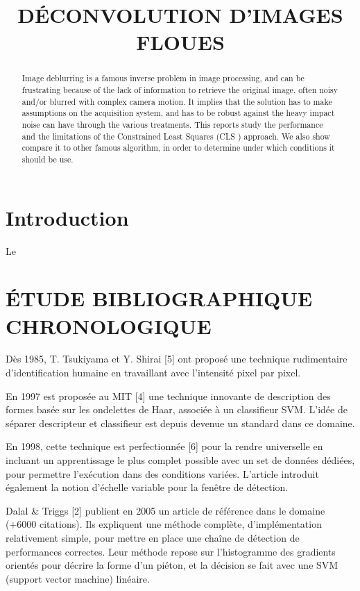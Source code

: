 \documentclass{article}
\title{D\'{E}CONVOLUTION D'IMAGES FLOUES}
\begin{document}
%
\maketitle
%
\begin{abstract}
	
	Image deblurring is a famous inverse problem in image processing, and can be frustrating because of the lack of information to retrieve the original image, often noisy and/or blurred with complex camera motion. It implies that the solution has to make assumptions on the acquisition system, and has to be robust against the heavy impact noise can have through the various treatments.
	This reports study the performance and the limitations of the Constrained Least Squares (CLS ) approach. We also show compare it to other famous algorithm, in order to determine under which conditions it should be use.
	
\end{abstract}
%

%
\section{Introduction}
\label{sec:intro}
	Le

\section{\'{E}TUDE BIBLIOGRAPHIQUE CHRONOLOGIQUE}
\label{sec:format}

	Dès 1985, T. Tsukiyama et Y. Shirai [5] ont proposé une technique rudimentaire d'identification humaine en travaillant avec l'intensité pixel par pixel.

	En 1997 est proposée au MIT [4] une technique innovante de description des formes basée sur les ondelettes de Haar, associée à un classifieur SVM. L'idée de séparer descripteur et classifieur est depuis devenue un standard dans ce domaine.

	En 1998, cette technique est perfectionnée [6] pour la rendre universelle en incluant un apprentissage le plus complet possible avec un set de données dédiées, pour permettre l'exécution dans des conditions variées. L'article introduit également la notion d'échelle variable pour la fenêtre de détection.

	Dalal \& Triggs [2] publient en 2005 un article de référence dans le domaine (+6000 citations). Ils expliquent une méthode complète, d'implémentation relativement simple, pour mettre en place une chaîne de détection de performances correctes. Leur méthode repose sur l'histogramme des gradients orientés pour décrire la forme d'un piéton, et la décision se fait avec une SVM (support vector machine) linéaire.
\end{document}
